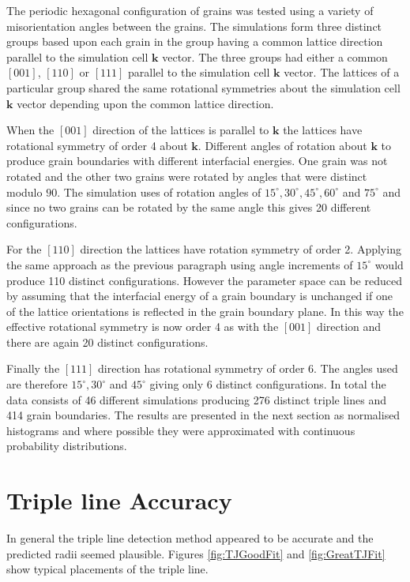 \documentclass[12pt,a4paper,openany]{report}
\begin{document}
The periodic hexagonal configuration of grains was tested using a variety of misorientation angles between the grains.  The simulations form three distinct groups based upon each grain in the group having a common lattice direction parallel to the simulation cell $\mathbf{k}$ vector. The three groups had either a common $[0 0 1]$, $[1 1 0]$ or $[1 1 1]$ parallel to the simulation cell $\mathbf{k}$ vector. The lattices of a particular group shared the same rotational symmetries about the simulation cell $\mathbf{k}$ vector depending upon the common lattice direction.

When the $[0 0 1]$ direction of the lattices is parallel to $\mathbf{k}$ the lattices have rotational symmetry of order 4 about $\mathbf{k}$.  Different angles of rotation about $\mathbf{k}$ to produce grain boundaries with different interfacial energies. One grain was not rotated and the other two grains were rotated by angles that were distinct modulo $90$. The simulation uses of rotation angles of $15^{\circ},30^{\circ},45^{\circ},60^{\circ}$ and $75^{\circ}$ and since no two grains can be rotated by the same angle this gives 20 different configurations.

For the $[1 1 0]$ direction the lattices have rotation symmetry of order 2. Applying the same approach as the previous paragraph using angle increments of $15^{\circ}$ would produce 110 distinct configurations. However the parameter space can be reduced by assuming that the interfacial energy of a grain boundary is unchanged if one of the lattice orientations is reflected in the grain boundary plane. In this way the effective rotational symmetry is now order 4 as with the $[0 0 1]$ direction and there are again 20 distinct configurations.  

Finally the $[1 1 1]$ direction has rotational symmetry of order 6. The angles used are therefore $15^{\circ},30^{\circ}$  and $45^{\circ}$ giving only 6 distinct configurations. In total the data consists of 46 different simulations producing 276 distinct triple lines and 414 grain boundaries. The results are presented in the next section as normalised histograms and where possible they were approximated with continuous probability distributions.  

\section{Triple line Accuracy}

In general the triple line detection method appeared to be accurate and the predicted radii seemed plausible. Figures  
\ref{fig:TJGoodFit} and \ref{fig:GreatTJFit} show typical placements of the triple line.
\end{document}

